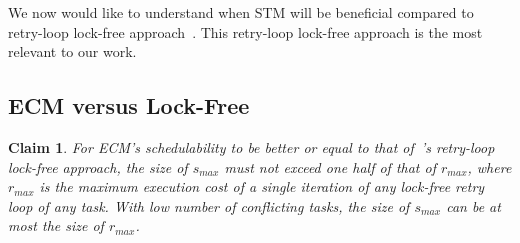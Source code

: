 \documentclass{sig-alternate}
\newtheorem{clm}{Claim}
\begin{document}
We now would like to understand when STM will be beneficial compared to retry-loop lock-free approach~\cite{key-5}. This retry-loop lock-free approach is the most relevant to our work. 


\subsection{\label{sub:G-EDF-scheduler-with} ECM versus Lock-Free}

\begin{clm}
For ECM's schedulability to be better or equal to that of~\cite{key-5}'s retry-loop lock-free approach,  
the size of $s_{max}$ must not exceed one half of that of $r_{max}$, where $r_{max}$ is the maximum execution cost of a single iteration of any lock-free retry loop of any task. With low number of conflicting tasks, the size of $s_{max}$ can be at most the size of $r_{max}$. 
\end{clm}
\end{document}
